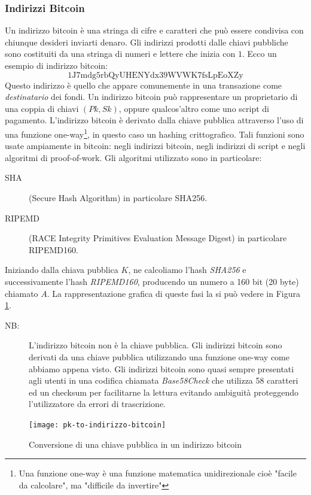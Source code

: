 \subsubsection{Indirizzi Bitcoin}
Un indirizzo bitcoin è una stringa di cifre e caratteri che può essere condivisa con chiunque desideri inviarti denaro. Gli indirizzi prodotti dalle chiavi pubbliche sono costituiti da una stringa di numeri e lettere che inizia con $1$. Ecco un esempio di indirizzo bitcoin:
\[ \text{1J7mdg5rbQyUHENYdx39WVWK7fsLpEoXZy} \]
Questo indirizzo è quello che appare comunemente in una transazione come \textit{destinatario} dei fondi. Un indirizzo bitcoin può rappresentare un proprietario di una coppia di chiavi $(Pk,Sk)$, oppure qualcos'altro come uno script di pagamento. 
L'indirizzo bitcoin è derivato dalla chiave pubblica attraverso l'uso di una funzione one-way\footnote{Una funzione one-way è una funzione matematica unidirezionale cioè "facile da calcolare", ma "difficile da invertire"}, in questo caso un hashing crittografico. Tali funzioni sono usate ampiamente in bitcoin: negli indirizzi bitcoin, negli indirizzi di script e negli algoritmi di proof-of-work. Gli algoritmi utilizzato sono in particolare:
\begin{description}
	\item[SHA] (Secure Hash Algorithm) in particolare SHA256.
	\item[RIPEMD] (RACE Integrity Primitives Evaluation Message Digest) in particolare RIPEMD160.
\end{description}
Iniziando dalla chiava pubblica $K$, ne calcoliamo l'hash \textit{SHA256} e successivamente l'hash \textit{RIPEMD160}, producendo un numero a 160 bit (20 byte) chiamato $A$. La rappresentazione grafica di queste fasi la si può vedere in Figura \ref{fig:pk-to-indirizzo-bitcoin}.
\begin{description}
	\item[NB:] L'indirizzo bitcoin non è la chiave pubblica. Gli indirizzi bitcoin sono derivati da una chiave pubblica utilizzando una funzione one-way come abbiamo appena visto. Gli indirizzi bitcoin sono quasi sempre presentati agli utenti in una codifica chiamata \textit{Base58Check} che utilizza 58 caratteri ed un checksum per facilitarne la lettura evitando ambiguità proteggendo l'utilizzatore da errori di trascrizione.
\end{description}

\begin{figure}
	\centering 
	\texttt{[image: pk-to-indirizzo-bitcoin]} 
	\caption[Da chiave pubblica a indirizzo bitcoin]{Conversione di una chiave pubblica in un indirizzo bitcoin}
	\label{fig:pk-to-indirizzo-bitcoin} 
\end{figure}

